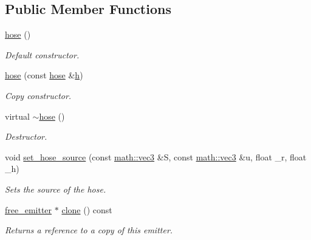 \subsection*{Public Member Functions}
\begin{DoxyCompactItemize}
\item 
\mbox{\label{classphysim_1_1emitters_1_1free__emitters_1_1hose_ae69ff0689f1e36850e034a508e84326f}} 
\hyperlink{classphysim_1_1emitters_1_1free__emitters_1_1hose_ae69ff0689f1e36850e034a508e84326f}{hose} ()
\begin{DoxyCompactList}\small\item\em Default constructor. \end{DoxyCompactList}\item 
\hyperlink{classphysim_1_1emitters_1_1free__emitters_1_1hose_ad20ae14c9c19227c1555fa9ce7f58891}{hose} (const \hyperlink{classphysim_1_1emitters_1_1free__emitters_1_1hose}{hose} \&\hyperlink{classphysim_1_1emitters_1_1free__emitters_1_1hose_ac1398640d981dd745b8d26e72bc7fe40}{h})
\begin{DoxyCompactList}\small\item\em Copy constructor. \end{DoxyCompactList}\item 
\mbox{\label{classphysim_1_1emitters_1_1free__emitters_1_1hose_a7063d70c22e19a7191067089f654d64d}} 
virtual \hyperlink{classphysim_1_1emitters_1_1free__emitters_1_1hose_a7063d70c22e19a7191067089f654d64d}{$\sim$hose} ()
\begin{DoxyCompactList}\small\item\em Destructor. \end{DoxyCompactList}\item 
void \hyperlink{classphysim_1_1emitters_1_1free__emitters_1_1hose_aeffa7bc72509d3ae1262244815f97737}{set\+\_\+hose\+\_\+source} (const \hyperlink{structphysim_1_1math_1_1vec3}{math\+::vec3} \&S, const \hyperlink{structphysim_1_1math_1_1vec3}{math\+::vec3} \&u, float \+\_\+r, float \+\_\+h)
\begin{DoxyCompactList}\small\item\em Sets the source of the hose. \end{DoxyCompactList}\item 
\mbox{\label{classphysim_1_1emitters_1_1free__emitters_1_1hose_a31a261d8cb387f018faaf070eb5aef1a}} 
\hyperlink{classphysim_1_1emitters_1_1free__emitter}{free\+\_\+emitter} $\ast$ \hyperlink{classphysim_1_1emitters_1_1free__emitters_1_1hose_a31a261d8cb387f018faaf070eb5aef1a}{clone} () const
\begin{DoxyCompactList}\small\item\em Returns a reference to a copy of this emitter. \end{DoxyCompactList}\end{DoxyCompactItemize}
